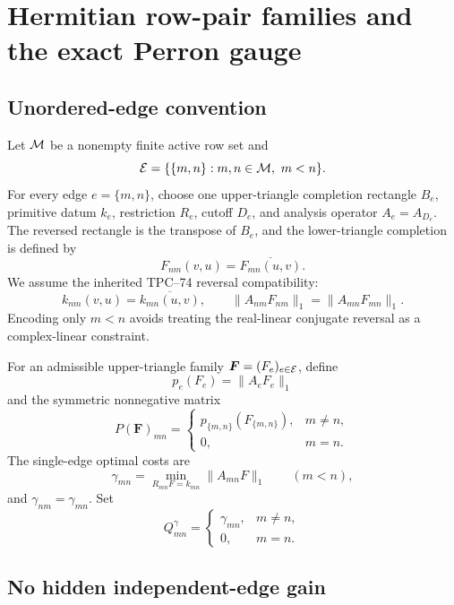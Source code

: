 \section{Hermitian row-pair families and the exact Perron gauge}
\label{sec:hermitian-family}

\subsection{Unordered-edge convention}

Let \(\mathcal M\) be a nonempty finite active row set and
\[
 \mathcal E=\{\{m,n\}:m,n\in\mathcal M,\ m<n\}.
\]
For every edge \(e=\{m,n\}\), choose one upper-triangle completion
rectangle \(B_e\), primitive datum \(k_e\), restriction \(R_e\), cutoff
\(D_e\), and analysis operator \(A_e=A_{D_e}\).  The reversed rectangle
is the transpose of \(B_e\), and the lower-triangle completion is defined
by
\begin{equation}
 F_{nm}(v,u)=\overline{F_{mn}(u,v)}.
 \label{eq:Hermitian-reversal}
\end{equation}
We assume the inherited TPC--74 reversal compatibility:
\[
 k_{nm}(v,u)=\overline{k_{mn}(u,v)},
 \qquad
 \|A_{nm}F_{nm}\|_1=\|A_{mn}F_{mn}\|_1.
\]
Encoding only \(m<n\) avoids treating the real-linear conjugate reversal
as a complex-linear constraint.

For an admissible upper-triangle family
\(\boldsymbol F=(F_e)_{e\in\mathcal E}\), define
\[
 p_e(F_e)=\|A_eF_e\|_1
\]
and the symmetric nonnegative matrix
\begin{equation}
 P(\boldsymbol F)_{mn}
 =
 \begin{cases}
  p_{\{m,n\}}(F_{\{m,n\}}),&m\ne n,\\
  0,&m=n.
 \end{cases}
 \label{eq:completion-majorant}
\end{equation}
The single-edge optimal costs are
\[
 \gamma_{mn}
 =
 \min_{R_{mn}F=k_{mn}}\|A_{mn}F\|_1
 \qquad(m<n),
\]
and \(\gamma_{nm}=\gamma_{mn}\).  Set
\begin{equation}
 Q^\gamma_{mn}
 =
 \begin{cases}
  \gamma_{mn},&m\ne n,\\
  0,&m=n.
 \end{cases}
 \label{eq:optimal-entry-matrix}
\end{equation}

\subsection{No hidden independent-edge gain}

